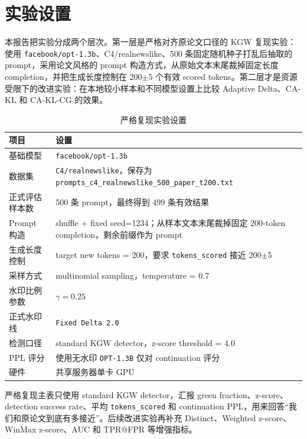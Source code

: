 \documentclass[12pt,a4paper,UTF8]{ctexart}
\newcommand{\method}{CA-KL}
\newcommand{\fullmethod}{CA-KL-CG}
\begin{document}
\section{实验设置}

本报告把实验分成两个层次。第一层是严格对齐原论文口径的 KGW 复现实验：使用 \texttt{facebook/opt-1.3b}、C4/realnewslike、500 条固定随机种子打乱后抽取的 prompt，采用论文风格的 prompt 构造方式，从原始文本末尾裁掉固定长度 completion，并把生成长度控制在 200$\pm$5 个有效 scored tokens。第二层才是资源受限下的改进实验：在本地较小样本和不同模型设置上比较 Adaptive Delta、\method{} 和 \fullmethod{} 的效果。

\begin{table}[H]
    \centering
    \caption{严格复现实验设置}
    \label{tab:setup}
    \begin{tabularx}{0.92\textwidth}{p{}X}
        \toprule
        项目 & 设置 \\
        \midrule
        基础模型 & \texttt{facebook/opt-1.3b} \\
        数据集 & \texttt{C4/realnewslike}，保存为 \texttt{prompts\_c4\_realnewslike\_500\_paper\_t200.txt} \\
        正式评估样本数 & 500 条 prompt，最终得到 499 条有效结果 \\
        Prompt 构造 & shuffle + fixed seed=1234；从样本文本末尾裁掉固定 200-token completion，剩余前缀作为 prompt \\
        生成长度控制 & target new tokens = 200，要求 \texttt{tokens\_scored} 接近 200$\pm$5 \\
        采样方式 & multinomial sampling，temperature = 0.7 \\
        水印比例参数 & $\gamma=0.25$ \\
        正式水印线 & \texttt{Fixed Delta 2.0} \\
        检测口径 & standard KGW detector，z-score threshold = 4.0 \\
        PPL 评分 & 使用无水印 \texttt{OPT-1.3B} 仅对 continuation 评分 \\
        硬件 & 共享服务器单卡 GPU \\
        \bottomrule
    \end{tabularx}
\end{table}

严格复现主表只使用 standard KGW detector，汇报 green fraction、z-score、detection success rate、平均 \texttt{tokens\_scored} 和 continuation PPL，用来回答“我们和原论文到底有多接近”。后续改进实验再补充 Distinct、Weighted z-score、WinMax z-score、AUC 和 TPR@FPR 等增强指标。
\end{document}
